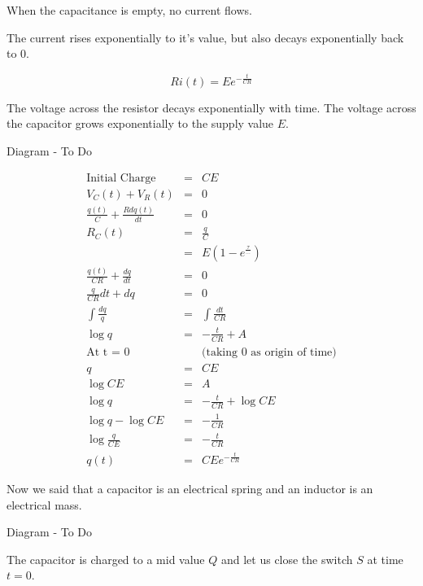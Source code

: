 \documentclass[a4paper,12pt]{article}
\begin{document}
When the capacitance is empty, no current flows.

The current rises exponentially to it's value, but also decays
exponentially back to $0$.

\[ R i(t) = E e^{-\frac{t}{CR}} \]

The voltage across the resistor decays exponentially with time. The
voltage across the capacitor grows exponentially to the supply value
$E$.

\begin{table}[hbtp]

Diagram - To Do

\end{table}

\begin{eqnarray*}
\mbox{Initial Charge } & = & CE \\
V_{C}(t) + V_{R}(t) & = & 0 \\
\frac{q(t)}{C} + \frac{R dq(t)}{dt} & = & 0 \\
R_{C}(t) & = & \frac{q}{C} \\
			& = & E \left(1 - e^{\frac{\tau}{\cdots}} \right) \\
\frac{q(t)}{CR} + \frac{dq}{dt} & = & 0 \\
\frac{q}{CR}dt + dq & = & 0 \\
\int \frac{dq}{q} & = & \int \frac{dt}{CR} \\
\log{q} & = & - \frac{t}{CR} + A \\
\mbox{At t = 0} & & \mbox{(taking $0$ as origin of time)} \\
q & = & CE \\
\log{CE} & = & A \\
\log{q} & = & - \frac{t}{CR} + \log{CE} \\
\log{q} - \log{CE} & = & - \frac{1}{CR} \\
\log{\frac{q}{CE}} & = & - \frac{t}{CR} \\
q(t) & = & CE e^{- \frac{t}{CR}}
\end{eqnarray*}

Now we said that a capacitor is an electrical spring and an inductor is
an electrical mass.

\begin{table}[hbtp]

Diagram - To Do

\end{table}

The capacitor is charged to a mid value $Q$ and let us close the switch
$S$ at time $t = 0$.
\end{document}
